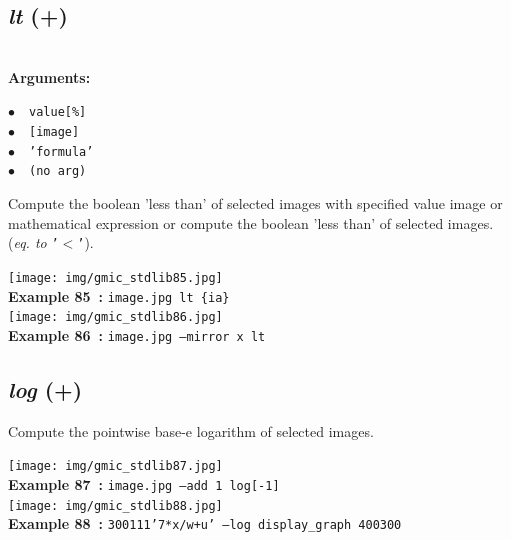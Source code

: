 \documentclass[a4paper,10.5pt,twoside]{book}
\def\comma{\discretionary{,}{}{,}}
\newcommand{\Cb}[1]{\textcolor{cb}{#1}}
\begin{document}
\subsection{\emph{lt} (+)}\vspace*{-0.7em}
~\\\textbf{\Cb{Arguments: }}\begin{flushleft}
{\small \Cb{\hspace*{0.5cm}$\bullet$~~\texttt{value[\%]}}}~~~\\
{\small \Cb{\hspace*{0.5cm}$\bullet$~~\texttt{[image]}}}~~~\\
{\small \Cb{\hspace*{0.5cm}$\bullet$~~\texttt{'formula'}}}~~~\\
{\small \Cb{\hspace*{0.5cm}$\bullet$~~\texttt{(no arg)}}}\end{flushleft}
Compute the boolean 'less than' of selected images with specified value{\comma} image or
mathematical expression{\comma} or compute the boolean 'less than' of selected images.
~\\(\emph{eq. to} {\small \texttt{'$<$'}}).
\begin{center}\texttt{[image: img/gmic\_stdlib85.jpg]}\\
{\footnotesize \textbf{Example 85~:} \texttt{image.jpg lt \{ia\}}}
\\\texttt{[image: img/gmic\_stdlib86.jpg]}\\
{\footnotesize \textbf{Example 86~:} \texttt{image.jpg --mirror x lt}}
\end{center}

\subsection{\emph{log} (+)}\vspace*{-0.7em}
Compute the pointwise base-e logarithm of selected images.
\begin{center}\texttt{[image: img/gmic\_stdlib87.jpg]}\\
{\footnotesize \textbf{Example 87~:} \texttt{image.jpg --add 1 log[-1]}}
\\\texttt{[image: img/gmic\_stdlib88.jpg]}\\
{\footnotesize \textbf{Example 88~:} \texttt{300{\comma}1{\comma}1{\comma}1{\comma}'7*x/w+u' --log display\_graph 400{\comma}300}}
\end{center}
\end{document}
